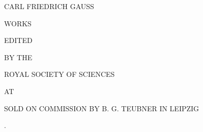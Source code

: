 \thispagestyle{empty}
\begin{center}
\vspace*{1em}
{\Large CARL FRIEDRICH GAUSS\par}
\vspace{2em}
{\LARGE WORKS\par}
\vspace{2em}
{\large{}\par}
\vspace{5em}
EDITED\par
\medskip
BY THE\par
\medskip
ROYAL SOCIETY OF SCIENCES\par
\medskip
AT\par
\medskip
{}\par
\vfill
SOLD ON COMMISSION BY B. G. TEUBNER IN LEIPZIG\par
{}.
\end{center}
\clearpage
